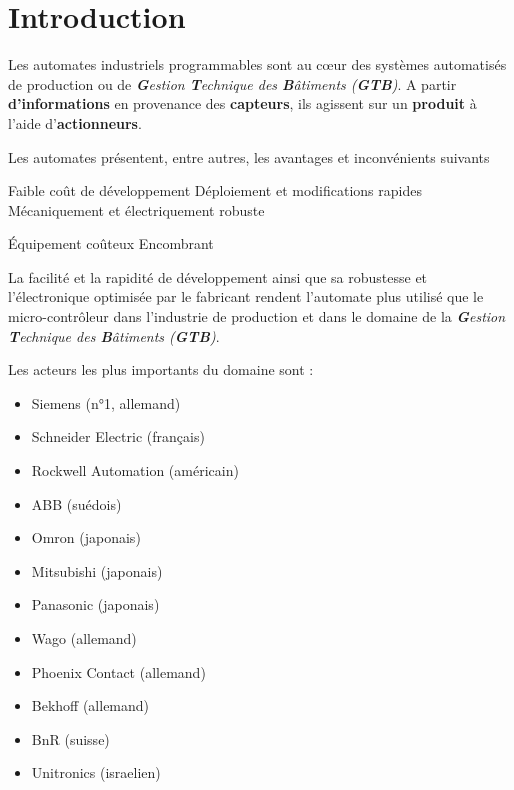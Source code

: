 \documentclass[11pt]{article}
\begin{document}
\UPSTIbuildPage


\tableofcontents
\pagebreak
\section{Introduction}
Les automates industriels programmables sont au cœur des systèmes automatisés de production ou de \textit{\textbf{G}estion \textbf{T}echnique des \textbf{B}âtiments (\textbf{GTB})}.
A partir \textbf{d'informations} en provenance des \textbf{capteurs}, ils agissent sur un \textbf{produit} à l'aide d'\textbf{actionneurs}.

Les automates présentent, entre autres, les avantages et inconvénients suivants

\begin{minipage}[t]{.49\linewidth}
	\begin{itemize}
		\itemc Faible coût de développement
		\itemc Déploiement et modifications rapides
		\itemc Mécaniquement et électriquement robuste
	\end{itemize}
\end{minipage}\hfill
\begin{minipage}[t]{.49\linewidth}
	\begin{itemize}
		\itemx Équipement coûteux
		\itemx Encombrant
	\end{itemize}
\end{minipage}

La facilité et la rapidité de développement ainsi que sa robustesse et l'électronique optimisée par le fabricant rendent l'automate plus utilisé que le micro-contrôleur dans l'industrie de production et dans le domaine de la \textit{\textbf{G}estion \textbf{T}echnique des \textbf{B}âtiments (\textbf{GTB})}.

Les acteurs les plus importants du domaine sont :
\begin{multicols}{2}
	\begin{itemize}
		\item Siemens (n°1, allemand)
		\item Schneider Electric (français)
		\item Rockwell Automation (américain)
		\item ABB (suédois)
		\item Omron (japonais)
		\item Mitsubishi (japonais)
		\item Panasonic (japonais)
		\item Wago (allemand)
		\item Phoenix Contact (allemand)
		\item Bekhoff (allemand)
		\item BnR (suisse)
		\item Unitronics (israelien)
	\end{itemize}
\end{multicols}




%
\end{document}
